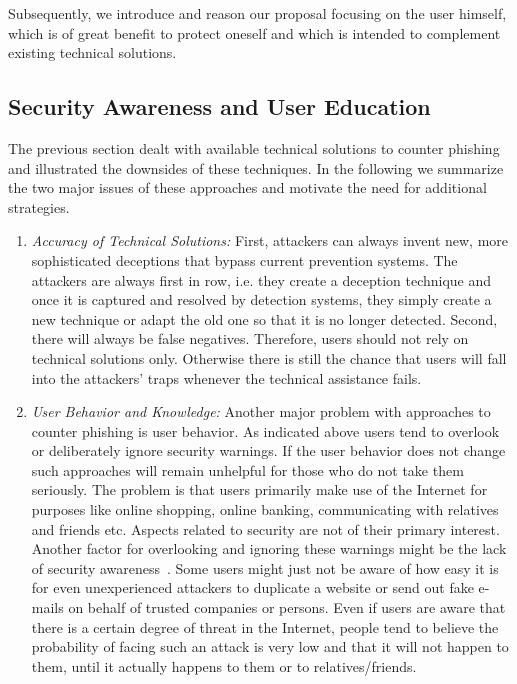 Subsequently, we introduce and reason our proposal focusing on the user himself, which is of great benefit to protect oneself and which is intended to complement existing technical solutions.
 \subsection{Security Awareness and User Education}
 \label{s:awareness}

The previous section dealt with available technical solutions to counter phishing and illustrated the downsides of these techniques.
In the following we summarize the two major issues of these approaches and motivate the need for additional strategies.
\begin{enumerate}
	\item\textit{Accuracy of Technical Solutions:} First, attackers can always invent new, more sophisticated deceptions that bypass current prevention systems.
	 The attackers are always first in row, i.e. they create a deception technique and once it is captured and resolved by detection systems, they simply create a new technique or adapt the old one so that it is no longer detected.
	 Second, there will always be false negatives.
Therefore, users should not rely on technical solutions only. 
Otherwise there is still the chance that users will fall into the attackers' traps whenever the technical assistance fails.
	\item\textit{User Behavior and Knowledge:} Another major problem with approaches to counter phishing is user behavior.
 As indicated above users tend to overlook or deliberately ignore security warnings.
 If the user behavior does not change such approaches will remain unhelpful for those who do not take them seriously.
 The problem is that users primarily make use of the Internet for purposes like online shopping, online banking, communicating with relatives and friends etc.
 Aspects related to security are not of their primary interest.
 Another factor for overlooking and ignoring these warnings might be the lack of security awareness~\cite{akhawe2013alice}.
 Some users might just not be aware of how easy it is for even unexperienced attackers to duplicate a website or send out fake e-mails on behalf of trusted companies or persons.
 Even if users are aware that there is a certain degree of threat in the Internet, people tend to believe the probability of facing such an attack is very low and that it will not happen to them, until it actually happens to them or to relatives/friends.
\end{enumerate}
